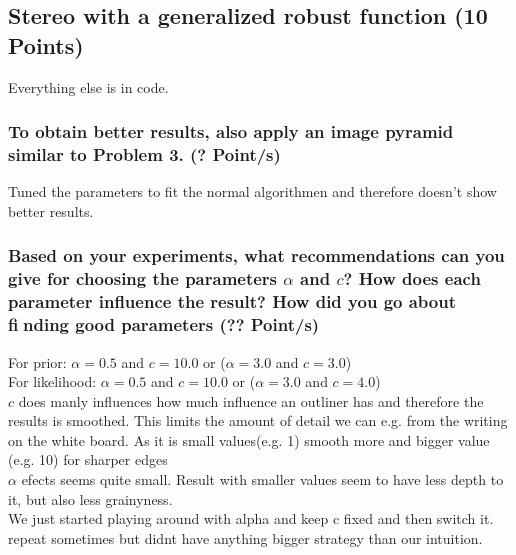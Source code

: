 \newif\ifvimbug
\vimbugfalse

\ifvimbug

\fi


\subsection{Stereo with a generalized robust function (10 Points)}
\setcounter{subsubsection}{3}
Everything else is in code.
\subsubsection{To obtain better results, also apply an image pyramid similar to Problem 3. (? Point/s)}
Tuned the parameters to fit the normal algorithmen and therefore doesn't show better results.\\
\subsubsection{Based on your experiments, what recommendations can you give for choosing the parameters $\alpha$ and $c$? How does each parameter influence the result? How did you go about finding good parameters (?? Point/s)}
For prior:  $\alpha = 0.5$ and $c=10.0$ or ($\alpha = 3.0$ and $c=3.0$)\\
For likelihood: $\alpha = 0.5$ and $c=10.0$ or  ($\alpha = 3.0$ and $c=4.0$)\\

$c$ does manly influences how much influence an outliner has and therefore the results is smoothed. This limits the amount of detail we can e.g. from the writing on the white board. As it is small values(e.g. 1) smooth more and bigger value (e.g. 10) for sharper edges\\
$\alpha$ efects seems quite small. Result with smaller values seem to have less depth to it, but also less grainyness.\\

We just started playing around with alpha and keep c fixed and then switch it. repeat sometimes but didnt have anything bigger strategy than our intuition.\\

